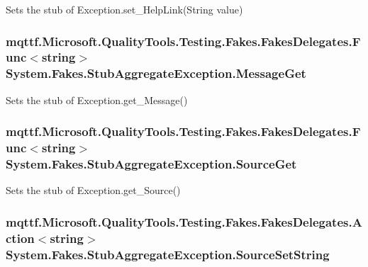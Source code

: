 Sets the stub of Exception.\-set\-\_\-\-Help\-Link(\-String value)

\hypertarget{class_system_1_1_fakes_1_1_stub_aggregate_exception_a06472927ced0b0be408bc3b62af270f5}{
\subsubsection[{Message\-Get}]{\setlength{\rightskip}{0pt plus 5cm}mqttf.\-Microsoft.\-Quality\-Tools.\-Testing.\-Fakes.\-Fakes\-Delegates.\-Func$<$string$>$ System.\-Fakes.\-Stub\-Aggregate\-Exception.\-Message\-Get}}\label{class_system_1_1_fakes_1_1_stub_aggregate_exception_a06472927ced0b0be408bc3b62af270f5}


Sets the stub of Exception.\-get\-\_\-\-Message()

\hypertarget{class_system_1_1_fakes_1_1_stub_aggregate_exception_a376572faf8d28ffce4f987c5e451e48a}{
\subsubsection[{Source\-Get}]{\setlength{\rightskip}{0pt plus 5cm}mqttf.\-Microsoft.\-Quality\-Tools.\-Testing.\-Fakes.\-Fakes\-Delegates.\-Func$<$string$>$ System.\-Fakes.\-Stub\-Aggregate\-Exception.\-Source\-Get}}\label{class_system_1_1_fakes_1_1_stub_aggregate_exception_a376572faf8d28ffce4f987c5e451e48a}


Sets the stub of Exception.\-get\-\_\-\-Source()

\hypertarget{class_system_1_1_fakes_1_1_stub_aggregate_exception_a01845a2418a9def8981f7f8eb8f3fda7}{
\subsubsection[{Source\-Set\-String}]{\setlength{\rightskip}{0pt plus 5cm}mqttf.\-Microsoft.\-Quality\-Tools.\-Testing.\-Fakes.\-Fakes\-Delegates.\-Action$<$string$>$ System.\-Fakes.\-Stub\-Aggregate\-Exception.\-Source\-Set\-String}}\label{class_system_1_1_fakes_1_1_stub_aggregate_exception_a01845a2418a9def8981f7f8eb8f3fda7}



